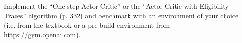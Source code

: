 
\begin{exercise}

Implement the \enquote{One-step Actor-Critic} or the \enquote{Actor-Critic with Eligibility Traces} algorithm (p. 332) and benchmark with an environment of your choice (i.e. from the textbook or a pre-build environment from \href{https://gym.openai.com}{https://gym.openai.com}).

\end{exercise}


\begin{solution}

\phantom{}

\end{solution}

